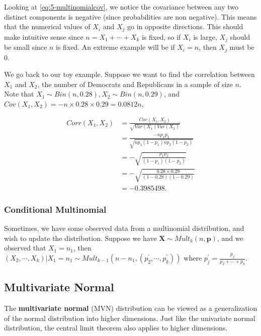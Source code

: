 \documentclass[
]{book}
\begin{document}
Looking at \eqref{eq:5-multinomialcov}, we notice the covariance between any two distinct components is negative (since probabilities are non negative). This means that the numerical values of \(X_i\) and \(X_j\) go in opposite directions. This should make intuitive sense since \(n = X_1 + \cdots + X_k\) is fixed, so if \(X_i\) is large, \(X_j\) should be small since \(n\) is fixed. An extreme example will be if \(X_i = n\), then \(X_j\) must be 0.

We go back to our toy example. Suppose we want to find the correlation between \(X_1\) and \(X_2\), the number of Democrats and Republicans in a sample of size \(n\). Note that \(X_1 \sim Bin(n,0.28), X_2 \sim Bin(n,0.29)\), and \(Cov(X_1,X_2) = -n \times 0.28 \times 0.29 = 0.0812n\),

\[
\begin{split}
Corr(X_1,X_2) &= \frac{Cov(X_1,X_2)}{\sqrt{Var(X_1) Var(X_2)}}\\
 &= \frac{-n p_1 p_2}{\sqrt{n p_1 (1-p_1) n p_2 (1-p_2)}} \\
 &= -\sqrt{\frac{p_1 p_2}{(1-p_1)(1-p_2)}} \\
 &= -\sqrt{\frac{0.28 \times 0.29}{(1-0.28)(1-0.29)}} \\
 &= -0.3985498.
\end{split}
\]

\subsubsection{Conditional Multinomial}\label{conditional-multinomial}

Sometimes, we have some observed data from a multinomial distribution, and wish to update the distribution. Suppose we have \(\boldsymbol{X} \sim Mult_k(n, \boldsymbol{p})\), and we observed that \(X_1 = n_1\), then \((X_2, \cdots, X_k)|X_1 = n_1 \sim Mult_{k-1}(n-n_1, (p_2^{\prime}, \cdots, p_k^{\prime}))\) where \(p_j^{\prime} = \frac{p_j}{p_2 + \cdots + p_k}\).

\subsection{Multivariate Normal}\label{multivariate-normal}

The \textbf{multivariate normal} (MVN) distribution can be viewed as a generalization of the normal distribution into higher dimensions. Just like the univariate normal distribution, the central limit theorem also applies to higher dimensions.
\end{document}
